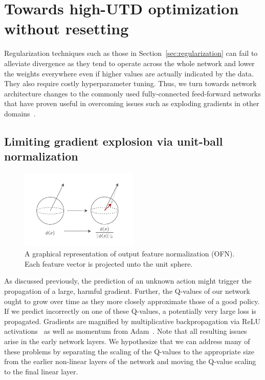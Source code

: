 \section{Towards high-UTD optimization without resetting} \label{sec:method}

Regularization techniques such as those in Section~\ref{sec:regularization} can fail to alleviate divergence as they tend to operate across the whole network and lower the weights everywhere even if higher values are actually indicated by the data. They also require costly hyperparameter tuning. Thus, we turn towards network architecture changes to the commonly used fully-connected feed-forward networks that have proven useful in overcoming issues such as exploding gradients in other domains~\parencite{ba2016layer, xu2019understanding}. 

\subsection{Limiting gradient explosion via unit-ball normalization} \label{sec:unitball}


\begin{figure}
    \centering
    \includegraphics[width=0.5\textwidth]{illustrations/thesis_dissecting_norm_vis.pdf}
    \caption{A graphical representation of output feature normalization (OFN). Each feature vector is projected unto the unit sphere.}
\end{figure}

As discussed previously, the prediction of an unknown action might trigger the propagation of a large, harmful gradient. Further, the Q-values of our network ought to grow over time as they more closely approximate those of a good policy. If we predict incorrectly on one of these Q-values, a potentially very large loss is propagated. Gradients are magnified by multiplicative backpropagation via ReLU activations~\parencite{glorot2011deep} as well as momentum from Adam~\parencite{kingma2015adam}. Note that all resulting issues arise in the early network layers. 
We hypothesize that we can address many of these problems by separating the scaling of the Q-values to the appropriate size from the earlier non-linear layers of the network and moving the Q-value scaling to the final linear layer.


